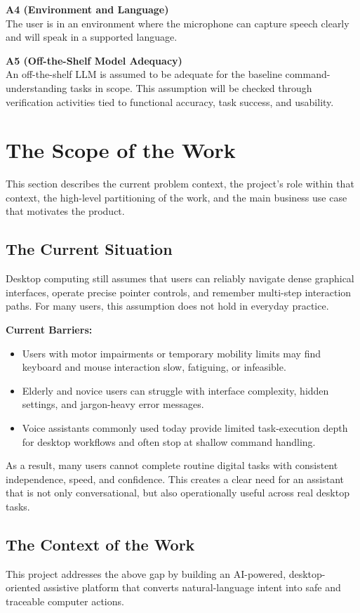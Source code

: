 \documentclass[12pt]{article}
\begin{document}
\noindent\textbf{A4 (Environment and Language)} \\
The user is in an environment where the microphone can capture speech
clearly and will speak in a supported language.

\noindent\textbf{A5 (Off-the-Shelf Model Adequacy)} \\
An off-the-shelf LLM is assumed to be adequate for the baseline
command-understanding tasks in scope. This assumption will be checked
through verification activities tied to functional accuracy, task
success, and usability.

\section{The Scope of the Work}
This section describes the current problem context, the project's role
within that context, the high-level partitioning of the work, and the
main business use case that motivates the product.

\subsection{The Current Situation}
Desktop computing still assumes that users can reliably navigate dense
graphical interfaces, operate precise pointer controls, and remember
multi-step interaction paths. For many users, this assumption does not
hold in everyday practice.

\textbf{Current Barriers:}
\begin{itemize}
  \item Users with motor impairments or temporary mobility limits may
  find keyboard and mouse interaction slow, fatiguing, or infeasible.
  \item Elderly and novice users can struggle with interface complexity,
  hidden settings, and jargon-heavy error messages.
  \item Voice assistants commonly used today provide limited
  task-execution depth for desktop workflows and often stop at shallow
  command handling.
\end{itemize}

As a result, many users cannot complete routine digital tasks with
consistent independence, speed, and confidence. This creates a clear
need for an assistant that is not only conversational, but also
operationally useful across real desktop tasks.

\subsection{The Context of the Work}
This project addresses the above gap by building an AI-powered,
desktop-oriented assistive platform that converts natural-language
intent into safe and traceable computer actions.
\end{document}

